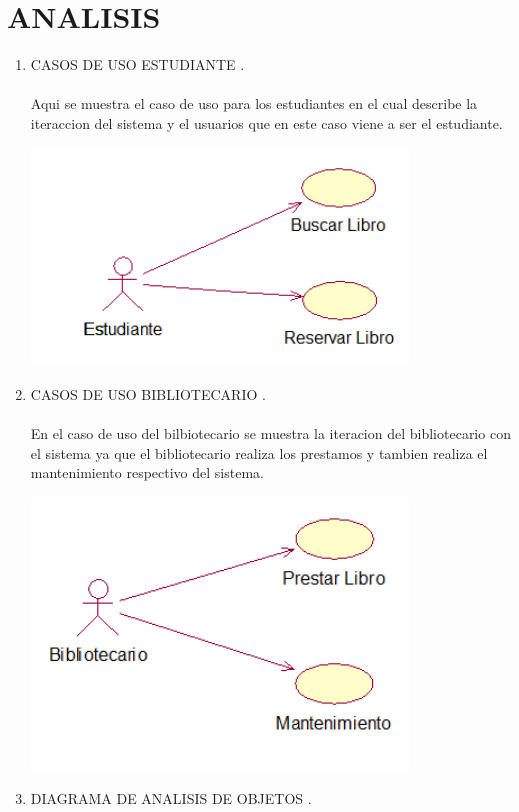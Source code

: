\section{ANALISIS} 

\begin{enumerate}[1.]
	\item CASOS DE USO ESTUDIANTE .\\\\
		Aqui se muestra el caso de uso para los estudiantes en el cual describe la iteraccion del sistema y el usuarios que en 			este caso viene a ser el estudiante.
	\begin{center}
	
	\includegraphics[width=10cm]{./Imagenes/img1} 
	\end{center}
	\item CASOS DE USO BIBLIOTECARIO .\\\\
		En el caso de uso del bilbiotecario se muestra la iteracion del bibliotecario con el sistema ya que el bibliotecario 	realiza los prestamos y tambien realiza el mantenimiento respectivo del sistema.
	\begin{center}
	\includegraphics[width=10cm]{./Imagenes/img2} 
	\end{center}
\newpage
   	 \item DIAGRAMA DE ANALISIS DE OBJETOS .\\\\

\end{enumerate}
